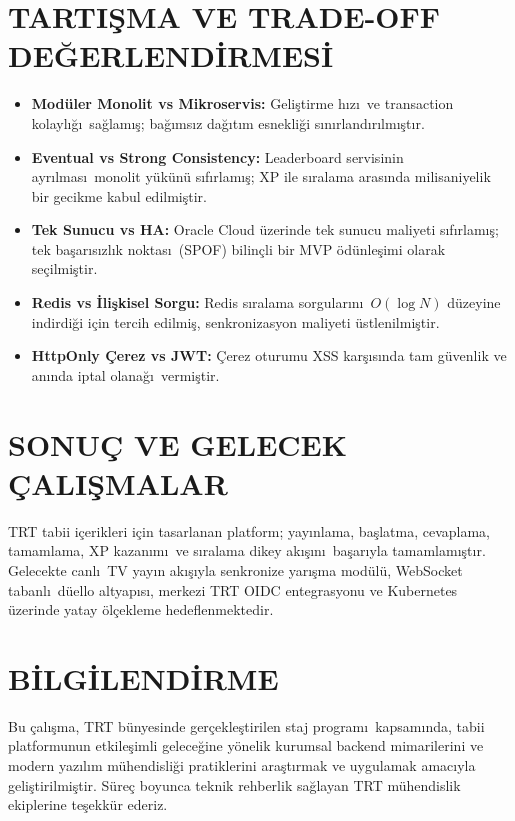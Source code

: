 \documentclass[conference,a4paper]{IEEEtran}
\begin{document}
\section{TARTI\c{S}MA VE TRADE-OFF DE\u{G}ERLEND\.{I}RMES\.{I}}
\begin{itemize}
    \item \textbf{Mod\"{u}ler Monolit vs Mikroservis:} Geli\c{s}tirme h\i z\i\ ve transaction kolayl\i\u{g}\i\ sa\u{g}lam\i\c{s}; ba\u{g}\i ms\i z da\u{g}\i t\i m esnekli\u{g}i s\i n\i rland\i r\i lm\i\c{s}t\i r.
    \item \textbf{Eventual vs Strong Consistency:} Leaderboard servisinin ayr\i lmas\i\ monolit y\"{u}k\"{u}n\"{u} s\i f\i rlam\i\c{s}; XP ile s\i ralama aras\i nda milisaniyelik bir gecikme kabul edilmi\c{s}tir.
    \item \textbf{Tek Sunucu vs HA:} Oracle Cloud \"{u}zerinde tek sunucu maliyeti s\i f\i rlam\i\c{s}; tek ba\c{s}ar\i s\i zl\i k noktas\i\ (SPOF) bilin\c{c}li bir MVP \"{o}d\"{u}nle\c{s}imi olarak se\c{c}ilmi\c{s}tir.
    \item \textbf{Redis vs \.{I}li\c{s}kisel Sorgu:} Redis s\i ralama sorgular\i n\i\ $O(\log N)$ d\"{u}zeyine indirdi\u{g}i i\c{c}in tercih edilmi\c{s}, senkronizasyon maliyeti \"{u}stlenilmi\c{s}tir.
    \item \textbf{HttpOnly \c{C}erez vs JWT:} \c{C}erez oturumu XSS kar\c{s}\i s\i nda tam g\"{u}venlik ve an\i nda iptal olana\u{g}\i\ vermi\c{s}tir.
\end{itemize}

\section{SONU\c{C} VE GELECEK \c{C}ALI\c{S}MALAR}
TRT tabii i\c{c}erikleri i\c{c}in tasarlanan platform; yay\i nlama, ba\c{s}latma, cevaplama, tamamlama, XP kazan\i m\i\ ve s\i ralama dikey ak\i\c{s}\i n\i\ ba\c{s}ar\i yla tamamlam\i\c{s}t\i r. Gelecekte canl\i\ TV yay\i n ak\i\c{s}\i yla senkronize yar\i\c{s}ma mod\"{u}l\"{u}, WebSocket tabanl\i\ d\"{u}ello altyap\i s\i, merkezi TRT OIDC entegrasyonu ve Kubernetes \"{u}zerinde yatay \"{o}l\c{c}ekleme hedeflenmektedir.

\section*{B\.{I}LG\.{I}LEND\.{I}RME}
Bu \c{c}al\i\c{s}ma, TRT b\"{u}nyesinde ger\c{c}ekle\c{s}tirilen staj program\i\ kapsam\i nda, tabii platformunun etkile\c{s}imli gelece\u{g}ine y\"{o}nelik kurumsal backend mimarilerini ve modern yaz\i l\i m m\"{u}hendisli\u{g}i pratiklerini ara\c{s}t\i rmak ve uygulamak amac\i yla geli\c{s}tirilmi\c{s}tir. S\"{u}re\c{c} boyunca teknik rehberlik sa\u{g}layan TRT m\"{u}hendislik ekiplerine te\c{s}ekk\"{u}r ederiz.
\end{document}
